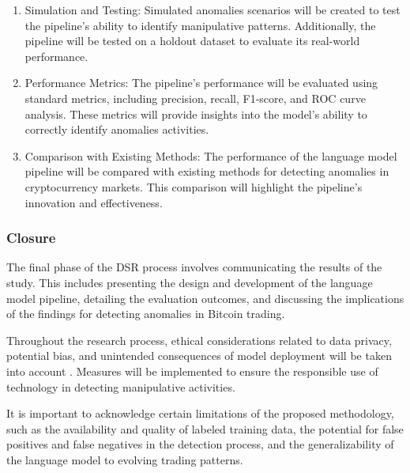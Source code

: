 \begin{enumerate}
    \item Simulation and Testing: Simulated anomalies scenarios will be created to test the pipeline's ability to
    identify manipulative patterns. Additionally, the pipeline will be tested on a holdout dataset to evaluate its
    real-world performance.
    \item Performance Metrics: The pipeline's performance will be evaluated using standard metrics, including precision,
    recall, F1-score, and ROC curve analysis. These metrics will provide insights into the model's ability to correctly
    identify anomalies activities.
    \item Comparison with Existing Methods: The performance of the language model pipeline will be compared with
    existing methods for detecting anomalies in cryptocurrency markets. This comparison will highlight the pipeline's
    innovation and effectiveness.
\end{enumerate}

\subsubsection{Closure}
The final phase of the DSR process involves communicating the results of the study. This includes presenting the design
and development of the language model pipeline, detailing the evaluation outcomes, and discussing the implications of
the findings for detecting anomalies in Bitcoin trading.

Throughout the research process, ethical considerations related to data privacy, potential bias, and unintended
consequences of model deployment will be taken into account \cite{barocas2017fairness, mittelstadt2016ethics}. Measures
will be implemented to ensure the responsible use of technology in detecting manipulative activities.

It is important to acknowledge certain limitations of the proposed methodology, such as the availability and quality of
labeled training data, the potential for false positives and false negatives in the detection process, and the
generalizability of the language model to evolving trading patterns.

%